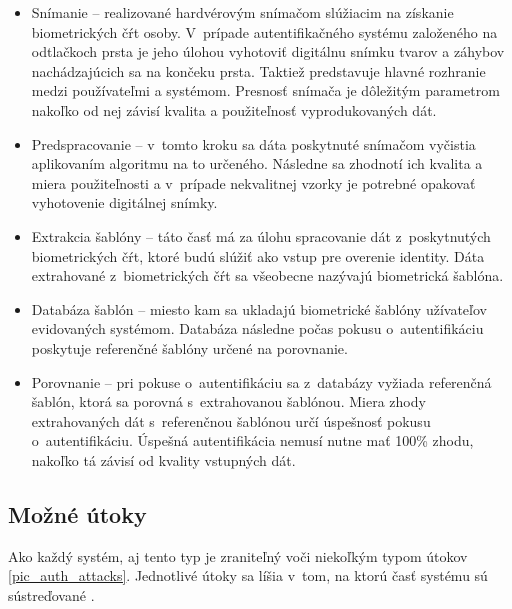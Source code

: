 \begin{itemize}
\item{Snímanie – realizované hardvérovým snímačom slúžiacim na získanie biometrických čŕt osoby. V~prípade autentifikačného systému založeného na odtlačkoch prsta je jeho úlohou vyhotoviť digitálnu snímku tvarov a záhybov nachádzajúcich sa na končeku prsta. Taktiež predstavuje hlavné rozhranie medzi používateľmi a systémom. Presnosť snímača je dôležitým parametrom nakoľko od nej závisí kvalita a použiteľnosť vyprodukovaných dát. 
}

\item{Predspracovanie – v~tomto kroku sa dáta poskytnuté snímačom vyčistia aplikovaním algoritmu na to určeného. Následne sa zhodnotí ich kvalita a miera použiteľnosti a v~prípade nekvalitnej vzorky je potrebné opakovať vyhotovenie digitálnej snímky.
}

\item{Extrakcia šablóny – táto časť má za úlohu spracovanie dát z~poskytnutých biometrických čŕt, ktoré budú slúžiť ako vstup pre overenie identity. Dáta extrahované z~biometrických čŕt sa všeobecne nazývajú biometrická šablóna.
}

\item{Databáza šablón – miesto kam sa ukladajú biometrické šablóny užívateľov evidovaných systémom. Databáza následne počas pokusu o~autentifikáciu poskytuje referenčné šablóny určené na porovnanie.
}

\item{Porovnanie – pri pokuse o~autentifikáciu sa z~databázy vyžiada referenčná šablón, ktorá sa porovná s~extrahovanou šablónou. Miera zhody extrahovaných dát s~referenčnou šablónou určí úspešnosť pokusu o~autentifikáciu. Úspešná autentifikácia nemusí nutne mať 100\% zhodu, nakoľko tá závisí od kvality vstupných dát.
}

\end{itemize}

\subsection{Možné útoky}
Ako každý systém, aj tento typ je zraniteľný voči niekoľkým typom útokov \ref{pic_auth_attacks}. Jednotlivé útoky sa líšia v~tom, na ktorú časť systému sú sústreďované \cite{biometric_authentication_threads1}.

